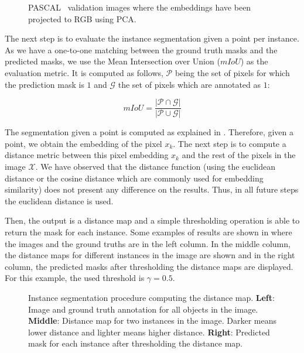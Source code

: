\begin{figure}[h]
  \centering
  \caption{PASCAL~\pascal{} validation images where the embeddings have been projected to RGB using PCA.}
  \label{fig:experiments:segmentation:pca}
\end{figure}

The next step is to evaluate the instance segmentation given a point per instance.
As we have a one-to-one matching between the ground truth masks and the predicted masks, we use the Mean Intersection over Union ($mIoU$) as the evaluation metric.
It is computed as follows, $\mathcal{P}$ being the set of pixels for which the prediction mask is $1$ and $\mathcal{G}$ the set of pixels which are annotated as $1$:

\begin{equation}
  mIoU = \frac{|\mathcal{P} \cap \mathcal{G}|}{|\mathcal{P} \cup \mathcal{G}|}
\end{equation}

The segmentation given a point is computed as explained in .
Therefore, given a point, we obtain the embedding of the pixel $x_k$.
The next step is to compute a distance metric between this pixel embedding $x_k$ and the rest of the pixels in the image $\mathcal{X}$.
We have observed that the distance function (using the euclidean distance or the cosine distance which are commonly used for embedding similarity) does not present any difference on the results.
Thus, in all future steps the euclidean distance is used.

Then, the output is a distance map and a simple thresholding operation is able to return the mask for each instance.
Some examples of results are shown in  where the images and the ground truths are in the left column.
In the middle column, the distance maps for different instances in the image are shown and in the right column, the predicted masks after thresholding the distance maps are displayed.
For this example, the used threshold is $\gamma = 0.5$.

\begin{figure}[h]
  \centering
  \caption{Instance segmentation procedure computing the distance map.
    \textbf{Left}: Image and ground truth annotation for all objects in the image.
    \textbf{Middle}: Distance map for two instances in the image. Darker means lower distance and lighter means higher distance.
    \textbf{Right}: Predicted mask for each instance after thresholding the distance map.
  }
  \label{fig:experiments:segmentation:distancemaps}
\end{figure}

